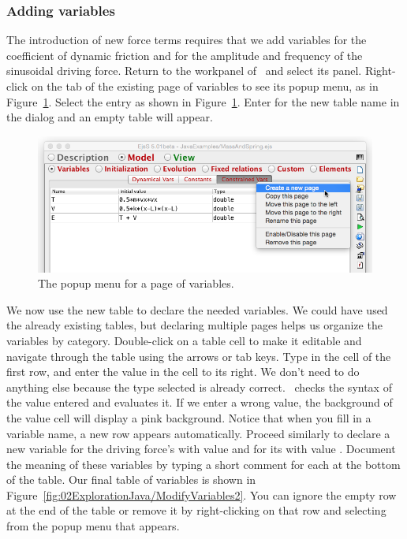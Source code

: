 \subsubsection{Adding variables}
The introduction of new force terms requires that we add variables for the coefficient of dynamic friction and for the amplitude and frequency of the sinusoidal driving force.  Return to the  workpanel of \ejs\ and select its  panel. Right-click on the tab of the existing page of variables to see its popup menu, as in Figure~\ref{fig:02ExplorationJava/ModifyVariables1}.
Select the  entry as shown in Figure~\ref{fig:02ExplorationJava/ModifyVariables1}. Enter  for the new table name in the dialog and an empty table will appear.

\begin{figure}[htb]
    \centering
  \includegraphics[scale=\scale]{02ExplorationJava/images/ModifyVariables1.png}
    \caption{The popup menu for a page of variables.}
    \label{fig:02ExplorationJava/ModifyVariables1}
\end{figure}

We now use the new table to declare the needed variables. We could have used the already existing tables, but declaring multiple pages helps us organize the variables by category. Double-click on a table cell to make it editable and navigate through the table using the arrows or tab keys. Type  in the  cell of the first row, and enter the value  in the  cell to its right. We don't need to do anything else because the  type selected is already correct.
\ejs\ checks the syntax of the value entered and evaluates it. If we enter a wrong value, the background of the value cell will display a pink background.
Notice that when you fill in a variable name, a new row appears automatically. Proceed similarly to declare a new variable for the driving force's  with value  and for its  with value . Document the meaning of these variables by typing a short comment for each at the bottom of the table. Our final table of variables is shown in Figure~\ref{fig:02ExplorationJava/ModifyVariables2}.  You can ignore the empty row at the end of the table or remove it by right-clicking on that row and selecting  from the popup menu that appears.


